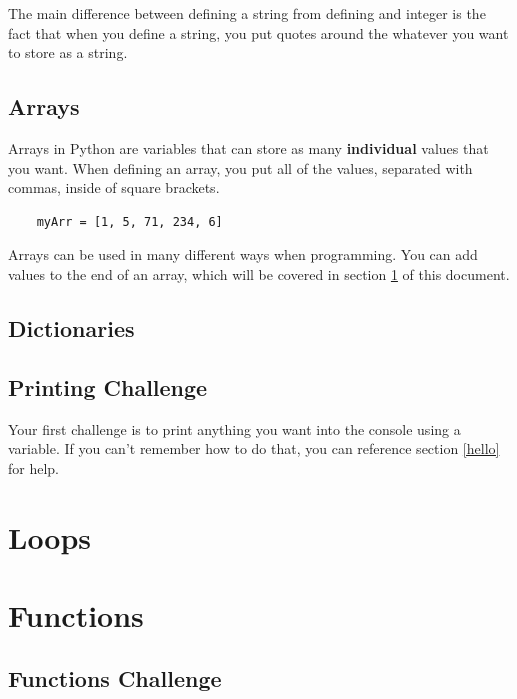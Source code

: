 \documentclass[12pt, letterpaper]{article}
\begin{document}
    The main difference between defining a string from defining and integer is the fact that when you define a string, you put quotes around the whatever you want to store as a string.

    \subsection{Arrays} \label{arrays}

    Arrays in Python are variables that can store as many \textbf{individual} values that you want. When defining an array, you put all of the values, separated with commas, inside of square brackets.

    \begin{verbatim}
    myArr = [1, 5, 71, 234, 6]
    \end{verbatim}

    Arrays can be used in many different ways when programming. You can add values to the end of an array, which will be covered in section \ref{loops} of this document.
    
    \subsection{Dictionaries} \label{dictionaries}

    

    \subsection{Printing Challenge} \label{hellochallenge}
    
    Your first challenge is to print anything you want into the console using a variable. If you can't remember how to do that, you can reference section \ref{hello} for help.

    \section{Loops} \label{loops}

    \section{Functions} \label{functions}

    \subsection{Functions Challenge} \label{functionschallenge}
\end{document}
